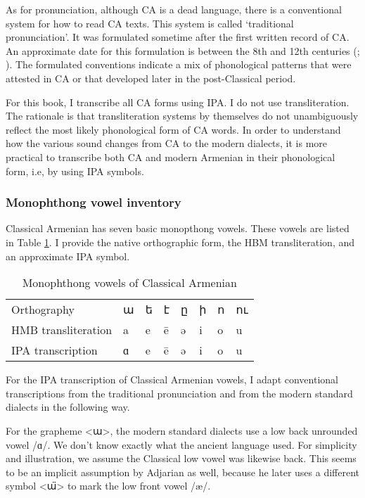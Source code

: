 As for pronunciation, although CA is a dead language, there is a conventional system for how to read CA texts. This system is called `traditional pronunciation'. It was formulated sometime after the first written record of CA. An approximate date for this formulation is between the 8th and 12th centuries (\citealt[24]{Godel-1975-IntroClassicalArmenian}; \citealt[1039]{Macak-2017-PhonoClassicalArmenian}). The formulated conventions indicate a mix of phonological patterns that were attested in CA or that developed later in the post-Classical period.

For this book, I transcribe all CA forms using IPA. I do not use transliteration. The rationale is that transliteration systems by themselves do not unambiguously reflect the most likely phonological form of CA words. In order to understand how the various sound changes from CA to the modern dialects, it is more practical to transcribe both CA and modern Armenian in their phonological form, i.e, by using IPA symbols. 
\subsubsection{Monophthong vowel inventory}\label{sec:HossepIntro:phonotransc:CA:mono}

Classical Armenian has seven basic monopthong vowels. These vowels are listed in Table \ref{tab:HossepIntr:classicalVowel}. I provide the native orthographic form, the HBM transliteration, and an approximate IPA symbol. 



\begin{table}[H]
	\centering
	\caption{Monophthong vowels of Classical Armenian}
	\label{tab:HossepIntr:classicalVowel}
	\begin{tabular}{|l|lllllll|}
		\hline 
		Orthography & ա & ե & է & ը& ի & ո & ու\\
		HMB transliteration & a & e & ē & ə & i & o & u \\
		IPA transcription & ɑ & e & ē & ə & i & o & u 
		\\ \hline
	\end{tabular}
\end{table}



For the IPA transcription of Classical Armenian vowels, I adapt conventional transcriptions from the traditional pronunciation and from the modern standard dialects in the following way. 


For the grapheme <ա>, the modern standard dialects use a low back unrounded vowel /ɑ/. We don't know exactly what the ancient language used. For simplicity and illustration, we assume the Classical low vowel was likewise back. This seems to be an implicit assumption by Adjarian as well, because he later uses a different symbol <ա̈> to mark the low front vowel /æ/. 

